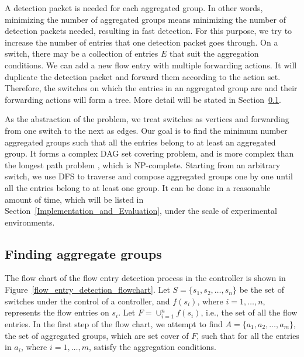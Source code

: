 A detection packet is needed for each aggregated group. In other words, minimizing the number of aggregated groups means minimizing the number of detection packets needed, resulting in fast detection. For this purpose, we try to increase the number of entries that one detection packet goes through. On a switch, there may be a collection of entries $E$ that suit the aggregation conditions. We can add a new flow entry with multiple forwarding actions. It will duplicate the detection packet and forward them according to the action set. Therefore, the switches on which the entries in an aggregated group are and their forwarding actions will form a tree. More detail will be stated in Section~\ref{Aggregated_group_finding}.

As the abstraction of the problem, we treat switches as vertices and forwarding from one switch to the next as edges. Our goal is to find the minimum number aggregated groups such that all the entries belong to at least an aggregated group. It forms a complex DAG set covering problem, \sout{} and is more complex than the longest path problem \cite{DMR97,RU04}, which is NP-complete. Starting from an arbitrary switch, we use DFS to traverse and compose aggregated groups one by one until all the entries belong to at least one group. It can be done in a reasonable amount of time, which will be listed in Section~\ref{Implementation_and_Evaluation}, under the scale of experimental environments.


\subsection{Finding aggregate groups}
\label{Aggregated_group_finding}

The flow chart of the flow entry detection process in the controller is shown in Figure~\ref{flow_entry_detection_flowchart}. Let $S=\{s_1,s_2,\ldots,s_n\}$ be the set of switches under the control of a controller, and $f(s_i)$, where $i=1,\ldots,n$, represents the flow entries on $s_i$. Let $F=\cup_{i=1}^n f(s_i)$, i.e., the set of all the flow entries. In the first step of the flow chart, we attempt to find $A=\{a_1, a_2, \ldots, a_m\}$, the set of aggregated groups, which are set cover of $F$, such that for all the entries in $a_i$, where $i=1,\ldots,m$, satisfy the aggregation conditions.

